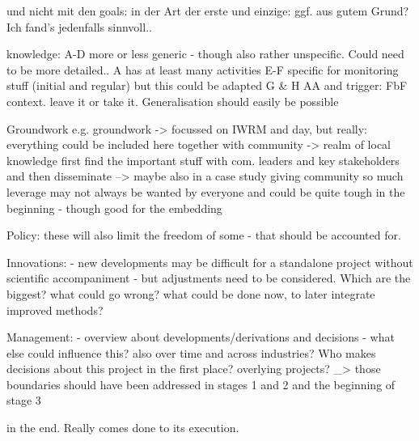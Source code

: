 und nicht mit den goals: in der Art der erste und einzige: ggf. aus gutem Grund? Ich fand's jedenfalls sinnvoll..

knowledge: A-D more or less generic - though also rather unspecific. Could need to be more detailed.. A has at least many activities
E-F specific for monitoring stuff (initial and regular) but this could be adapted
G \& H AA and trigger: FbF context. leave it or take it. Generalisation should easily be possible

Groundwork
e.g. groundwork -> focussed on IWRM and day, but really: everything could be included here
together with community -> realm of local knowledge
first find the important stuff with com. leaders and key stakeholders and then disseminate --> maybe also in a case study
giving community so much leverage may not always be wanted by everyone and could be quite tough in the beginning - though good for the embedding

Policy: these will also limit the freedom of some - that should be accounted for.

Innovations:
- new developments may be difficult for a standalone project without scientific accompaniment
- but adjustments need to be considered. Which are the biggest? what could go wrong? what could be done now, to later integrate improved methods?

Management:
- overview about developments/derivations and decisions
- what else could influence this? also over time and across industries? Who makes decisions about this project in the first place? overlying projects? _> those boundaries should have been addressed in stages 1 and 2 and the beginning of stage 3

in the end. Really comes done to its execution.






